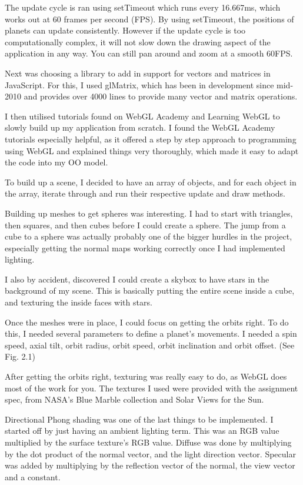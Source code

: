 \documentclass{scrreprt}
\begin{document}
The update cycle is ran using setTimeout which runs every 16.667ms, which works out at 60 frames per second (FPS). By using setTimeout, the positions of planets can update consistently. However if the update cycle is too computationally complex, it will not slow down the drawing aspect of the application in any way. You can still pan around and zoom at a smooth 60FPS.

Next was choosing a library to add in support for vectors and matrices in JavaScript. For this, I used glMatrix\cite{glmatrix}, which has been in development since mid-2010 and provides over 4000 lines to provide many vector and matrix operations.

I then utilised tutorials found on WebGL Academy\cite{webglacademy} and Learning WebGL\cite{learningwebgl} to slowly build up my application from scratch. I found the WebGL Academy tutorials especially helpful, as it offered a step by step approach to programming using WebGL and explained things very thoroughly, which made it easy to adapt the code into my OO model.

To build up a scene, I decided to have an array of objects, and for each object in the array, iterate through and run their respective update and draw methods.

Building up meshes to get spheres was interesting. I had to start with triangles, then squares, and then cubes before I could create a sphere. The jump from a cube to a sphere was actually probably one of the bigger hurdles in the project, especially getting the normal maps working correctly once I had implemented lighting.

I also by accident, discovered I could create a skybox to have stars in the background of my scene. This is basically putting the entire scene inside a cube, and texturing the inside faces with stars.

Once the meshes were in place, I could focus on getting the orbits right. To do this, I needed several parameters to define a planet's movements. I needed a spin speed, axial tilt, orbit radius, orbit speed, orbit inclination and orbit offset. (See Fig. 2.1)

After getting the orbits right, texturing was really easy to do, as WebGL does most of the work for you. The textures I used were provided with the assignment spec, from NASA's Blue Marble collection\cite{bluemarblenasa} and Solar Views for the Sun\cite{solarviews}.

Directional Phong shading was one of the last things to be implemented. I started off by just having an ambient lighting term. This was an RGB value multiplied by the surface texture's RGB value. Diffuse was done by multiplying by the dot product of the normal vector, and the light direction vector. Specular was added by multiplying by the reflection vector of the normal, the view vector and a constant.
\end{document}
